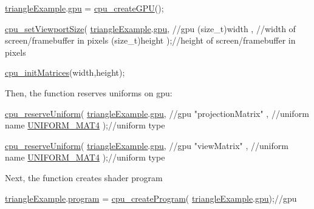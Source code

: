 \begin{DoxyCodeInclude}
  \hyperlink{triangleExample_8c_af82b723635ac0c90962571915a1b1163}{triangleExample}.\hyperlink{structTriangleExampleVariables_a6c5c3f82065ae9aac07f9e6f11dd03b3}{gpu} = \hyperlink{gpu_8h_ace6f4308ad5d67c778e48e434f435e7d}{cpu\_createGPU}();

  \hyperlink{gpu_8h_a35867aa85ba3dc4c33d03f6a2842f5af}{cpu\_setViewportSize}(
      \hyperlink{triangleExample_8c_af82b723635ac0c90962571915a1b1163}{triangleExample}.\hyperlink{structTriangleExampleVariables_a6c5c3f82065ae9aac07f9e6f11dd03b3}{gpu}, \textcolor{comment}{//gpu}
      (\textcolor{keywordtype}{size\_t})width      , \textcolor{comment}{//width of screen/framebuffer in pixels}
      (\textcolor{keywordtype}{size\_t})height     );\textcolor{comment}{//height of screen/framebuffer in pixels}

  \hyperlink{mouseCamera_8c_a7e7e918a9328502b7c35cfbbdb068b7b}{cpu\_initMatrices}(width,height);
\end{DoxyCodeInclude}
Then, the function reserves uniforms on gpu\+: 
\begin{DoxyCodeInclude}
  \hyperlink{uniforms_8h_acd308bcb7720918cb48f75292a247dfb}{cpu\_reserveUniform}(
      \hyperlink{triangleExample_8c_af82b723635ac0c90962571915a1b1163}{triangleExample}.\hyperlink{structTriangleExampleVariables_a6c5c3f82065ae9aac07f9e6f11dd03b3}{gpu}, \textcolor{comment}{//gpu}
      \textcolor{stringliteral}{"projectionMatrix"} , \textcolor{comment}{//uniform name}
      \hyperlink{uniforms_8h_a0d2757b6f370648e2dc98adc54edb97daa3eed90ee47c4ca58597e4115f3557d4}{UNIFORM\_MAT4}       );\textcolor{comment}{//uniform type}

  \hyperlink{uniforms_8h_acd308bcb7720918cb48f75292a247dfb}{cpu\_reserveUniform}(
      \hyperlink{triangleExample_8c_af82b723635ac0c90962571915a1b1163}{triangleExample}.\hyperlink{structTriangleExampleVariables_a6c5c3f82065ae9aac07f9e6f11dd03b3}{gpu}, \textcolor{comment}{//gpu}
      \textcolor{stringliteral}{"viewMatrix"}       , \textcolor{comment}{//uniform name}
      \hyperlink{uniforms_8h_a0d2757b6f370648e2dc98adc54edb97daa3eed90ee47c4ca58597e4115f3557d4}{UNIFORM\_MAT4}       );\textcolor{comment}{//uniform type}
\end{DoxyCodeInclude}
Next, the function creates shader program 
\begin{DoxyCodeInclude}
  \hyperlink{triangleExample_8c_af82b723635ac0c90962571915a1b1163}{triangleExample}.\hyperlink{structTriangleExampleVariables_aabf788228d2e91e2718facfbd911c8cc}{program} = \hyperlink{program_8h_a4fca7a0e3dac7f93620a1bde6efcde16}{cpu\_createProgram}(
      \hyperlink{triangleExample_8c_af82b723635ac0c90962571915a1b1163}{triangleExample}.\hyperlink{structTriangleExampleVariables_a6c5c3f82065ae9aac07f9e6f11dd03b3}{gpu});\textcolor{comment}{//gpu}
\end{DoxyCodeInclude}
